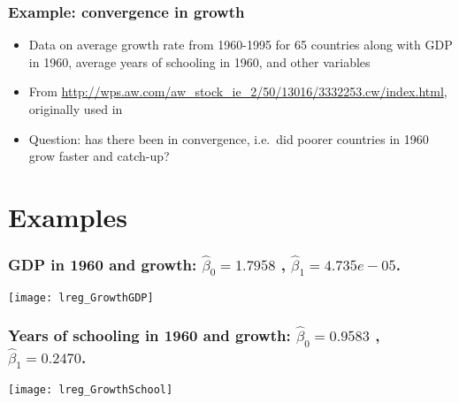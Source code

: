 





\begin{frame}\frametitle{Example: convergence in growth}
  \begin{itemize}
  \item Data on average growth rate from 1960-1995 for 65 countries
    along with GDP in 1960, average years of schooling in 1960, and
    other variables
  \item From
    \url{http://wps.aw.com/aw_stock_ie_2/50/13016/3332253.cw/index.html},
    originally used in \cite{beck2000}
  \item Question: has there been in convergence, i.e.\ did poorer
    countries in 1960 grow faster and catch-up?    
  \end{itemize}
\end{frame}

\section{Examples}
\begin{frame}\frametitle{GDP in 1960 and growth: $\hat{\beta}_0 = 1.7958$ ,
    $\hat{\beta}_1 = 4.735e-05$. }

  \texttt{[image: lreg\_GrowthGDP]}   

\end{frame}

\begin{frame}\frametitle{Years of schooling in 1960 and growth: $\hat{\beta}_0 =  0.9583$ ,
    $\hat{\beta}_1 = 0.2470$.}

  \texttt{[image: lreg\_GrowthSchool]}   

\end{frame}

